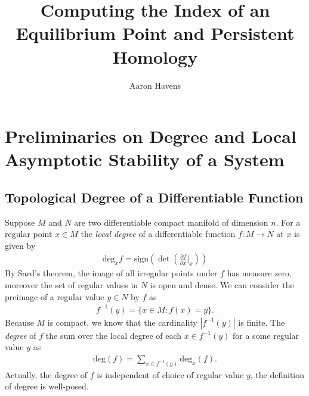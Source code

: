 \documentclass[12pt]{article}
\begin{document}
 
\title{Computing the Index of an Equilibrium Point and Persistent Homology}
\author{Aaron Havens}
\maketitle

\section{Preliminaries on Degree and Local Asymptotic Stability of a System}
\subsection{Topological Degree of a Differentiable Function}
Suppose $M$ and $N$ are two differentiable compact manifold of dimension $n$. For a regular point $x\in M$ the \textit{local degree} of a differentiable function $f: M \rightarrow N$ at $x$ is given by
\begin{align}
\text{deg}_x f = \text{sign} \left( \det \left( \frac{\partial f}{\partial x}\Big\rvert_{x} \right) \right)
\end{align}
By Sard's theorem, the image of all irregular points under $f$ has measure zero, moreover the set of regular values in $N$ is open and dense. We can consider the preimage of a regular value $y \in N$ by $f$ as
\begin{align*}
f^{-1}(y) = \{x\in M : f(x) = y\}.
\end{align*}
Because $M$ is compact, we know that the cardinality $|f^{-1}(y)|$ is finite. The \textit{degree} of $f$ the sum over the local degree of each $x \in f^{-1}(y)$ for a some regular value $y$ as
\begin{align*}\label{eq:top_deg}
\text{deg}(f) =\sum_{x\in f^{-1}(y)} \text{deg}_x(f). 
\end{align*}
Actually, the degree of $f$ is independent of choice of regular value $y$, the definition of degree is well-posed.
\end{document}

